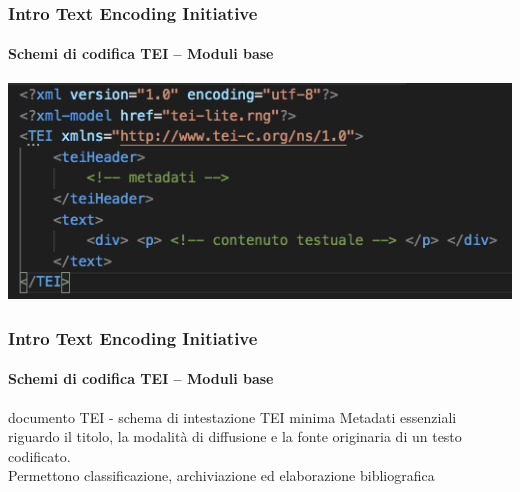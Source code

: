 \begin{frame}
	\frametitle{Intro Text Encoding Initiative}
	\framesubtitle{Schemi di codifica TEI – Moduli base}
	\addtocounter{nframe}{1}

	\begin{center}
		\includegraphics[width=.95\textwidth]{imgs/esempio2.png}
    \end{center}
    
   

\end{frame}

\begin{frame}
	\frametitle{Intro Text Encoding Initiative}
	\framesubtitle{Schemi di codifica TEI – Moduli base}
	\addtocounter{nframe}{1}

	\begin{block}{documento TEI - schema di intestazione TEI minima}
        Metadati essenziali riguardo il titolo, la modalità di diffusione e
        la fonte originaria di un testo codificato.
        \\Permettono classificazione, archiviazione ed elaborazione
        bibliografica
    \end{block}
    
\end{frame}




